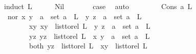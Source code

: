 \begin{isabellebody}
{\isacharparenleft}{\kern0pt}induct\ L{\isacharparenright}{\kern0pt}\isanewline
\ \ \ \ \isamarkupfalse%
\ Nil\isanewline
\ \ \ \ \isamarkupfalse%
\ \isamarkupfalse%
\ {\isacharquery}{\kern0pt}case\ \isamarkupfalse%
\ auto\isanewline
\ \ \isamarkupfalse%
\isanewline
\ \ \ \ \isamarkupfalse%
\ {\isacharparenleft}{\kern0pt}Cons\ a\ L{\isacharparenright}{\kern0pt}\isanewline
\ \ \ \ \isamarkupfalse%
\ \isamarkupfalse%
\ {\isacharparenleft}{\kern0pt}nor{\isacharparenright}{\kern0pt}\ {\isachardoublequoteopen}{\isacharparenleft}{\kern0pt}x{\isacharcomma}{\kern0pt}\ y{\isacharparenright}{\kern0pt}\ {\isasymin}\ {\isacharbraceleft}{\kern0pt}a{\isacharbraceright}{\kern0pt}\ {\isasymtimes}\ set\ {\isacharparenleft}{\kern0pt}a\ {\isacharhash}{\kern0pt}\ L{\isacharparenright}{\kern0pt}\ {\isasymand}\ {\isacharparenleft}{\kern0pt}y{\isacharcomma}{\kern0pt}\ z{\isacharparenright}{\kern0pt}\ {\isasymin}\ {\isacharbraceleft}{\kern0pt}a{\isacharbraceright}{\kern0pt}\ {\isasymtimes}\ set\ {\isacharparenleft}{\kern0pt}a\ {\isacharhash}{\kern0pt}\ L{\isacharparenright}{\kern0pt}{\isachardoublequoteclose}\ \isanewline
\ \ \ \ \ \ {\isacharbar}{\kern0pt}\ {\isacharparenleft}{\kern0pt}xy{\isacharparenright}{\kern0pt}\ {\isachardoublequoteopen}{\isacharparenleft}{\kern0pt}x{\isacharcomma}{\kern0pt}y{\isacharparenright}{\kern0pt}\ {\isasymin}\ list{\isacharunderscore}{\kern0pt}to{\isacharunderscore}{\kern0pt}rel\ L\ {\isasymand}\ {\isacharparenleft}{\kern0pt}y{\isacharcomma}{\kern0pt}\ z{\isacharparenright}{\kern0pt}\ {\isasymin}\ {\isacharbraceleft}{\kern0pt}a{\isacharbraceright}{\kern0pt}\ {\isasymtimes}\ set\ {\isacharparenleft}{\kern0pt}a\ {\isacharhash}{\kern0pt}\ L{\isacharparenright}{\kern0pt}{\isachardoublequoteclose}\ \isanewline
\ \ \ \ \ \ {\isacharbar}{\kern0pt}\ {\isacharparenleft}{\kern0pt}yz{\isacharparenright}{\kern0pt}\ {\isachardoublequoteopen}{\isacharparenleft}{\kern0pt}y{\isacharcomma}{\kern0pt}z{\isacharparenright}{\kern0pt}\ {\isasymin}\ list{\isacharunderscore}{\kern0pt}to{\isacharunderscore}{\kern0pt}rel\ L\ {\isasymand}\ {\isacharparenleft}{\kern0pt}x{\isacharcomma}{\kern0pt}\ y{\isacharparenright}{\kern0pt}\ {\isasymin}\ {\isacharbraceleft}{\kern0pt}a{\isacharbraceright}{\kern0pt}\ {\isasymtimes}\ set\ {\isacharparenleft}{\kern0pt}a\ {\isacharhash}{\kern0pt}\ L{\isacharparenright}{\kern0pt}{\isachardoublequoteclose}\isanewline
\ \ \ \ \ \ {\isacharbar}{\kern0pt}\ {\isacharparenleft}{\kern0pt}both{\isacharparenright}{\kern0pt}\ {\isachardoublequoteopen}{\isacharparenleft}{\kern0pt}y{\isacharcomma}{\kern0pt}z{\isacharparenright}{\kern0pt}\ {\isasymin}\ list{\isacharunderscore}{\kern0pt}to{\isacharunderscore}{\kern0pt}rel\ L\ {\isasymand}\ {\isacharparenleft}{\kern0pt}x{\isacharcomma}{\kern0pt}y{\isacharparenright}{\kern0pt}\ {\isasymin}\ list{\isacharunderscore}{\kern0pt}to{\isacharunderscore}{\kern0pt}rel\ L{\isachardoublequoteclose}\ \isamarkupfalse%

\end{isabellebody}
